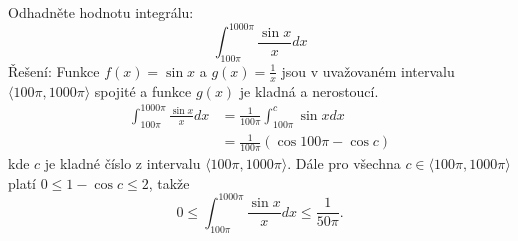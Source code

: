 \begin{mdframed}[style=mdexam]
  \begin{example}\label{mai:exam097}
    Odhadněte hodnotu integrálu:
    \begin{equation}\label{MA_eq_sinx_x}
        \int_{100\pi}^{1000\pi}\frac{\sin x}{x}dx
    \end{equation}
    Řešení: Funkce $f(x) = \sin x$ a $g(x) = \frac{1}{x}$ jsou v uvažovaném intervalu $\langle
    100\pi, 1000\pi \rangle$ spojité a funkce $g(x)$ je kladná a nerostoucí.
    \begin{align*}
      \int_{100\pi}^{1000\pi}\frac{\sin x}{x}dx 
        &=\frac{1}{100\pi}\int_{100\pi}^c\sin xdx                                   \\
        &=\frac{1}{100\pi}\left(\cos100\pi - \cos c\right)
    \end{align*}
    kde $c$ je kladné číslo z intervalu $\langle 100\pi, 1000\pi \rangle$. Dále pro všechna
    $c\in\langle 100\pi, 1000\pi \rangle$ platí $0\leq1-\cos c\leq2$, takže
    \begin{equation*}
        0\leq\int_{100\pi}^{1000\pi}\frac{\sin x}{x}dx\leq \frac{1}{50\pi}.
    \end{equation*}
  \end{example}  
\end{mdframed}